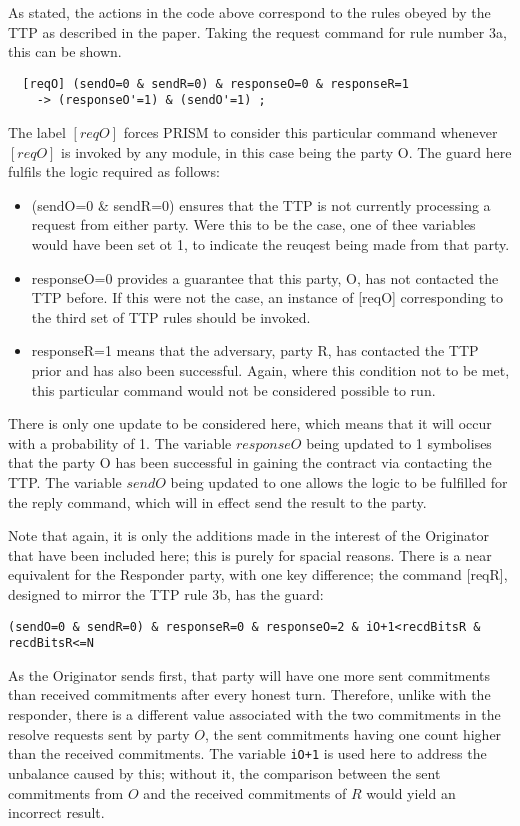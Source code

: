 \documentclass{l4proj}
\begin{document}
As stated, the actions in the code above correspond to the rules obeyed by the TTP as described in the paper. Taking the request command for rule number 3a, this can be shown.

\begin{verbatim}
  [reqO] (sendO=0 & sendR=0) & responseO=0 & responseR=1 
    -> (responseO'=1) & (sendO'=1) ;
\end{verbatim}
The label $[reqO]$ forces PRISM to consider this particular command whenever $[reqO]$ is invoked by any module, in this case being the party O. The guard here fulfils the logic required as follows:
\begin{itemize}
\item (sendO=0 \& sendR=0) ensures that the TTP is not currently processing a request from either party. Were this to be the case, one of thee variables would have been set ot 1, to indicate the reuqest being made from that party.
\item responseO=0 provides a guarantee that this party, O, has not contacted the TTP before. If this were not the case, an instance of [reqO] corresponding to the third set of TTP rules should be invoked.
\item responseR=1 means that the adversary, party R, has contacted the TTP prior and has also been successful. Again, where this condition not to be met, this particular command would not be considered possible to run.
\end{itemize}
There is only one update to be considered here, which means that it will occur with a probability of 1. The variable $responseO$ being updated to 1 symbolises that the party O has been successful in gaining the contract via contacting the TTP. The variable $sendO$ being updated to one allows the logic to be fulfilled for the reply command, which will in effect send the result to the party. 


 Note that again, it is only the additions made in the interest of the Originator that have been included here; this is purely for spacial reasons. There is a near equivalent for the Responder party, with one key difference; the command [reqR], designed to mirror the TTP rule 3b, has the guard:
\begin{lstlisting}
(sendO=0 & sendR=0) & responseR=0 & responseO=2 & iO+1<recdBitsR & recdBitsR<=N
\end{lstlisting}
 As the Originator sends first, that party will have one more sent commitments than received commitments after every honest turn. 
 Therefore, unlike with the responder, there is a different value associated with the two commitments in the resolve requests sent by party $O$, the sent commitments having one count higher than the received commitments. The variable {\tt iO+1} is used here to address the unbalance caused by this; without it, the comparison between the sent commitments from $O$ and the received commitments of $R$ would yield an incorrect result. 
\end{document}
